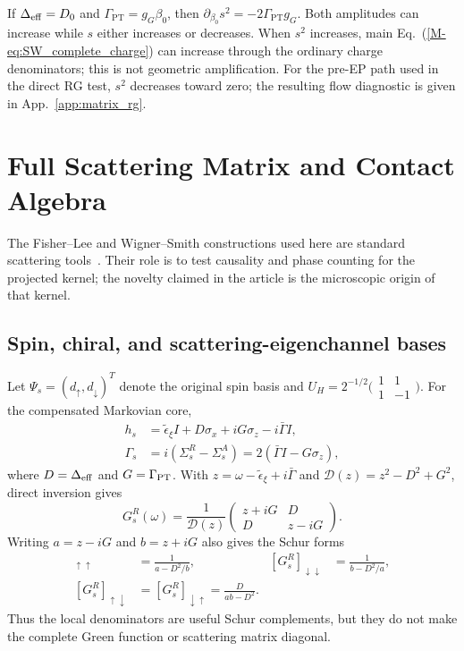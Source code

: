 \documentclass[%
  aps,physrev,onecolumn,10pt,amsmath,amssymb,superscriptaddress,longbibliography,floatfix
]{revtex4-2}
\newcommand{\teps}{\tilde{\epsilon}_{\xi}}
\newcommand{\Gpt}{\Gamma_{\mathrm{PT}}}   %
\newcommand{\Deff}{\Delta_{\rm eff}}     %
\begin{document}
If $\Deff=D_0$ and $\Gpt=g_G\beta_0$, then $\partial_{\beta_0}s^2 =-2\Gpt g_G$.
Both amplitudes can increase while $s$ either increases or decreases.
When $s^2$ increases, main Eq.~(\ref{M-eq:SW_complete_charge}) can increase through
the ordinary charge denominators; this is not geometric amplification.
For the pre-EP path used in the direct RG test, $s^2$ decreases toward zero;
the resulting flow diagnostic is given in App.~\ref{app:matrix_rg}.

\section{Full Scattering Matrix and Contact Algebra}
\label{app:Smatrix}

The Fisher--Lee and Wigner--Smith constructions used here are standard
scattering tools~\cite{fisherlee1981,wigner1955,smith1960}.  Their role is
to test causality and phase counting for the projected kernel; the novelty
claimed in the article is the microscopic origin of that kernel.

\subsection{Spin, chiral, and scattering-eigenchannel bases}

Let $\Psi_s=(d_\uparrow,d_\downarrow)^T$ denote the original spin basis and $U_H=2^{-1/2}\bigl(\begin{smallmatrix}1&1\\1&-1\end{smallmatrix}\bigr)$.
For the compensated Markovian core,
\begin{align}
h_s&=\teps I+D\sigma_x+iG\sigma_z-i\bar\Gamma I,\nonumber\\
\Gamma_s&=i(\Sigma_s^R-\Sigma_s^A)
=2(\bar\Gamma I-G\sigma_z),
\label{eq:spin_kernel_rate}
\end{align}
where $D=\Delta_{\rm eff}$ and $G=\Gamma_{\rm PT}$.  With
$z=\omega-\teps+i\bar\Gamma$ and
$\mathcal D(z)=z^2-D^2+G^2$, direct inversion gives
\begin{equation}
G_s^R(\omega)=\frac{1}{\mathcal D(z)}
\begin{pmatrix}
z+iG&D\\ D&z-iG
\end{pmatrix}.
\label{eq:GR_spin_explicit}
\end{equation}
Writing $a=z-iG$ and $b=z+iG$ also gives the Schur forms
\begin{align}
[G_s^R]_{\uparrow\uparrow}
&=\frac{1}{a-D^2/b},&
[G_s^R]_{\downarrow\downarrow}
&=\frac{1}{b-D^2/a},\nonumber\\
[G_s^R]_{\uparrow\downarrow}
&=[G_s^R]_{\downarrow\uparrow}
=\frac{D}{ab-D^2}.
\label{eq:spin_schur_coefficients}
\end{align}
Thus the local denominators are useful Schur complements, but they do not
make the complete Green function or scattering matrix diagonal.
\end{document}
